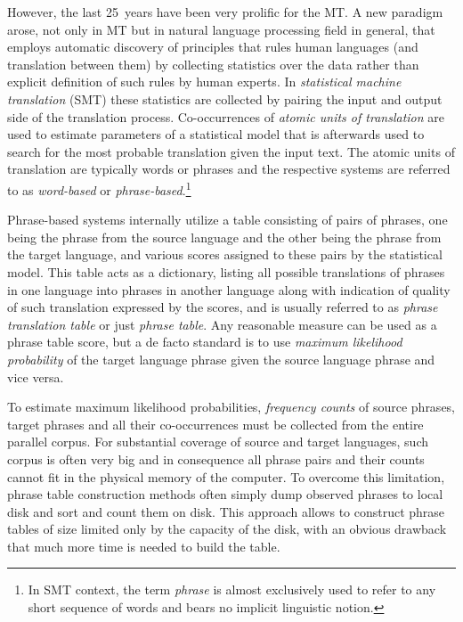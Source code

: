However, the last 25~years have been very prolific for the MT.
A new paradigm arose, not only in MT but in natural language processing
field in general, that employs automatic discovery of principles that
rules human languages (and translation between them) by collecting
statistics over the data rather than explicit definition of such rules
by human experts.
In \emph{statistical machine translation} (SMT) these statistics are
collected by pairing the input and output side of the translation process.
Co-occurrences of \emph{atomic units of translation} are used to
estimate parameters of a statistical model that is afterwards used to
search for the most probable translation given the input text.
The atomic units of translation are typically words or phrases and
the respective systems are referred to as \emph{word-based} or
\emph{phrase-based}.\footnote{In SMT context, the term \emph{phrase} is almost
exclusively used to refer to any short sequence of words and bears no
implicit linguistic notion.}

Phrase-based systems internally utilize a table consisting of pairs of
phrases, one being the phrase from the source language and the other
being the phrase from the target language, and various scores assigned to
these pairs by the statistical model.
This table acts as a dictionary, listing all possible translations of phrases
in one language into phrases in another language along with indication of
quality of such translation expressed by the scores, and is usually referred
to as \emph{phrase translation table} or just \emph{phrase table}.
Any reasonable measure can be used as a phrase table score, but a de facto
standard is to use \emph{maximum likelihood probability} of the target language
phrase given the source language phrase and vice versa.

To estimate maximum likelihood probabilities, \emph{frequency counts} of source
phrases, target phrases and all their co-occurrences must be collected from
the entire parallel corpus.
For substantial coverage of source and target languages, such corpus is often
very big and in consequence all phrase pairs and their counts cannot fit in
the physical memory of the computer.
To overcome this limitation, phrase table construction methods often simply
dump observed phrases to local disk and sort and count them on disk.
This approach allows to construct phrase tables of size limited only by
the capacity of the disk, with an obvious drawback that much more time is
needed to build the table.

